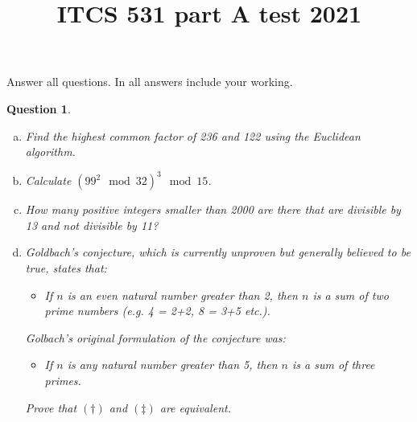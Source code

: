 \documentclass{article}
\begin{document}
\title{ITCS 531 part A test 2021}
\author{}
\date{}
\theoremstyle{plain}
\newtheorem{Q}{Question}
\maketitle
Answer all questions. In all answers include your working.
\begin{Q}
\begin{enumerate}[a)]
\item Find the highest common factor of 236 and 122 using the Euclidean algorithm.
\item Calculate $(99^2 \mod 32)^3 \mod 15$.
\item How many positive integers smaller than 2000 are there that are divisible by 13 and not divisible by 11?
\item Goldbach's conjecture, which is currently unproven but generally believed to be true, states that:
\begin{itemize}
\item[$(\dagger)$] If $n$ is an even natural number greater than 2, then $n$ is a sum of two prime numbers (e.g. 4 = 2+2, 8 = 3+5 etc.).
\end{itemize}
Golbach's original formulation of the conjecture was:
\begin{itemize}
\item[$(\ddagger)$] If $n$ is any natural number greater than 5, then $n$ is a sum of three primes.
\end{itemize}
Prove that $(\dagger)$ and $(\ddagger)$ are equivalent.

\end{enumerate}
\end{Q}
\end{document}

